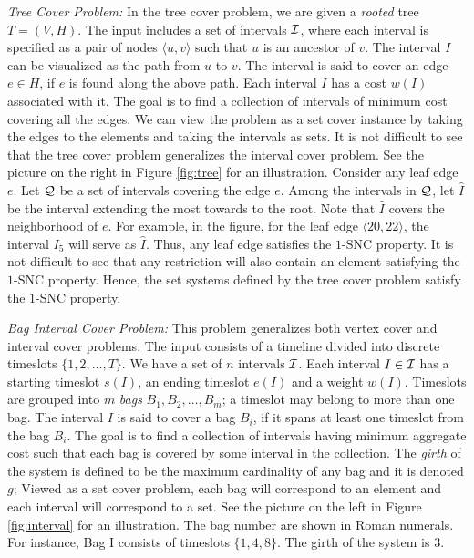 \documentclass[11pt]{article}
\newcommand{\calQ} {{\cal Q}}
\newcommand{\calI} {{\cal I}}
\newcommand{\wh}[1] {\widehat{#1}}
\newcommand{\pair}[2] {\langle #1, #2\rangle}
\begin{document}
{\em Tree Cover Problem: }
In the tree cover problem, we are given a {\em rooted} tree $T=(V,H)$.
The input includes a set of intervals $\calI$, where each interval is specified as a pair of nodes $\pair{u}{v}$
such that $u$ is an ancestor of $v$. The interval $I$ can be visualized as the path from $u$ to $v$.
The interval is said to cover an edge $e\in H$, if $e$ is found along the above path.
Each interval $I$ has a cost $w(I)$ associated with it.
The goal is to find a collection of intervals of minimum cost covering all the edges.
We can view the problem as a set cover instance by taking the edges to the elements
and taking the intervals as sets.
It is not difficult to see that the tree cover problem generalizes the interval cover problem. 
See the picture on the right in Figure \ref{fig:tree} for an illustration.
Consider any leaf edge $e$. Let $\calQ$ be a set of intervals covering the edge $e$.
Among the intervals in $\calQ$, let $\wh{I}$ be the interval extending the most
towards to the root. Note that $\wh{I}$ covers the neighborhood of $e$.
For example, in the figure, for the leaf edge $\pair{20}{22}$, the interval $I_5$ will serve as $\wh{I}$.
Thus, any leaf edge satisfies the $1$-SNC property.
It is not difficult to see that any restriction will also contain an element satisfying the $1$-SNC property. 
Hence, the set systems defined by the tree cover problem satisfy the $1$-SNC property.

{\em Bag Interval Cover Problem: }
This problem generalizes both vertex cover and interval cover problems.
The input consists of a timeline divided into discrete timeslots $\{1,2,\ldots, T\}$.
We have a set of $n$ intervals $\calI$. 
Each interval $I \in \calI$ has a starting timeslot $s(I)$, an ending timeslot $e(I)$ and a weight $w(I)$. 
Timeslots are grouped into $m$ {\em bags} $B_1, B_2, \ldots, B_m$; a timeslot may belong to more than one bag.
The interval $I$ is said to cover a bag $B_i$, if it spans at least one timeslot from the bag $B_i$.
The goal is to find a collection of intervals having minimum aggregate cost such that
each bag is covered by some interval in the collection. 
The {\em girth} of the system is defined to be the maximum cardinality of any bag and it is denoted $g$; 
Viewed as a set cover problem, each bag will correspond to an element and 
each interval will correspond to a set. 
See the picture on the left in Figure \ref{fig:interval} for an illustration. The bag number are shown in Roman numerals.
For instance, Bag I consists of timeslots $\{1,4,8\}$. The girth of the system is $3$.
\end{document}
